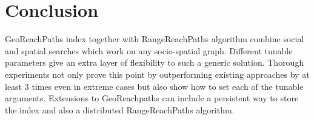 \section{Conclusion} \label{sec:conclusion}
GeoReachPaths index together with RangeReachPaths algorithm combine social and spatial searches which work on any socio-spatial graph. Different tunable parameters give an extra layer of flexibility to such a generic solution. Thorough experiments not only prove this point by outperforming existing approaches by at least 3 times even in extreme cases but also show how to set each of the tunable arguments. Extensions to GeoReachpaths can include a persistent way to store the index and also a distributed RangeReachPaths algorithm.
